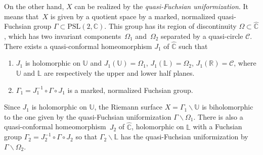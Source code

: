 \documentclass[10pt,a4paper]{amsart}
\numberwithin{equation}{section}
\begin{document}
On the other hand, $X$ can be realized by the \emph{quasi-Fuchsian uniformization}. It means that~$X$ is given by a quotient space by a marked, normalized quasi-Fuchsian group $\Gamma \subset \text{PSL}(2,\mathbb{C})$.
This group has its region of discontinuity $\Omega\subset \hat{\mathbb{C}}$, which has two invariant components~$\Omega_1$ and~$\Omega_2$ separated by a quasi-circle $\mathcal{C}$. There exists a quasi-conformal homeomorphism $J_1$ of $\hat{\mathbb{C}}$ such that

\begin{enumerate}
\item[\textbf{QF1}]$J_1$ is holomorphic on $\mathbb{U}$ and $J_1(\mathbb{U})=\Omega_1$, $J_1(\mathbb{L})=\Omega_2$, $J_1(\mathbb{R})=\mathcal{C}$, where $\mathbb{U}$ and $\mathbb{L}$ are respectively the upper and lower half planes.
\item[\textbf{QF2}] $ \Gamma_1=J_1^{-1}\circ \Gamma\circ J_1$ is a marked, normalized Fuchsian group.
\end{enumerate}
 Since $J_1$ is holomorphic on $\mathbb{U}$, the Riemann surface $X=\Gamma_1\backslash \mathbb{U}$ is biholomorphic to the one given by the quasi-Fuchsian uniformization $\Gamma\backslash \Omega_1$. There is also a quasi-conformal homeomorphism~$J_2$ of $\hat{\mathbb{C}}$, holomorphic on $\mathbb{L}$ with a Fuchsian group $\Gamma_2=J_2^{-1}\circ \Gamma\circ J_2$ so that $\Gamma_2\backslash \mathbb{L}$ has the quasi-Fuchsian uniformization by $\Gamma\backslash\Omega_2$.
\end{document}
